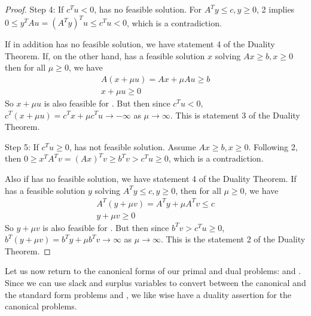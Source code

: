 \begin{proof}
Step 4:
If $c^T u < 0$,  has no feasible solution.
For $A^T y \le c, y \ge 0$, 2 implies $0 \le y^T A u = (A^T y)^T u \le c^T u < 0$, which is a contradiction.

If in addition  has no feasible solution, we have statement 4 of the Duality Theorem.
If, on the other hand,  has a feasible solution $x$ solving $A x \ge b, x \ge 0$ then for all $\mu \ge 0$, we have
\begin{align}
A (x + \mu u) = A x + \mu A u \ge b \\
x + \mu u \ge 0
\end{align}
So $x + \mu u$ is also feasible for . 
But then since $c^T u < 0$, $c^T (x + \mu u) = c^T x + \mu c^T u \to -\infty$ as $\mu \to \infty$.
This is statement 3 of the Duality Theorem.

Step 5:
If $c^T u \ge 0$,  has not feasible solution.
Assume $A x \ge b, x \ge 0$.
Following 2, then $0 \ge x^T A^T v = (Ax)^T v \ge b^T v > c^T u \ge 0$, which is a contradiction.

Also if  has no feasible solution, we have statement 4 of the Duality Theorem.
If  has a feasible solution $y$ solving $A^T y \le c, y \ge 0$, then for all $\mu \ge 0$, we have
\begin{align}
A^T (y + \mu v) = A^T y + \mu A^T v \le c \\
y + \mu v \ge 0
\end{align}
So $y + \mu v$ is also feasible for .
But then since $b^T v > c^T u \ge 0$, $b^T (y + \mu v) = b^T y + \mu b^T v \to \infty$ as $\mu \to \infty$.
This is the statement 2 of the Duality Theorem.
\end{proof}

Let us now return to the canonical forms of our primal and dual problems:  and .
Since we can use slack and surplus variables to convert between the canonical and the standard form problems  and , we like wise have a duality assertion for the canonical problems.

